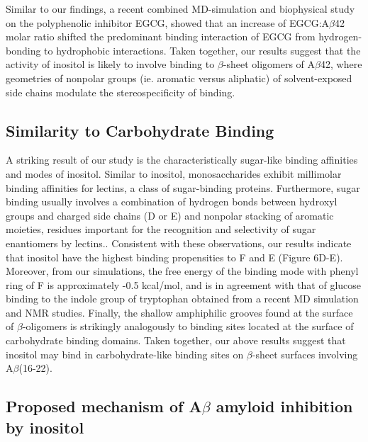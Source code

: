 Similar to our findings, a recent combined MD-simulation and biophysical study\cite{Wang:2010p204} on the polyphenolic inhibitor EGCG,\cite{Ehrnhoefer:2008p8,Wang:2010p204} showed that an increase of EGCG:A$\beta$42 molar ratio shifted the predominant binding interaction of EGCG from hydrogen-bonding to hydrophobic interactions.
Taken together, our results suggest that the activity of inositol is likely to involve binding to $\beta$-sheet oligomers of A$\beta$42, where geometries of nonpolar groups (ie. aromatic versus aliphatic) of solvent-exposed side chains modulate the stereospecificity of binding.


\subsection{Similarity to Carbohydrate Binding}

A striking result of our study is the characteristically sugar-like \cite{Taroni:2000p195} binding affinities and modes of inositol. Similar to inositol, monosaccharides exhibit millimolar binding affinities for lectins, a class of sugar-binding proteins.\cite{Wohlert:2010p201,Geisler:2010p188} Furthermore, sugar binding usually involves a combination of hydrogen bonds between hydroxyl groups and charged side chains (D or E) and nonpolar stacking of aromatic moieties, residues important for the recognition and selectivity of sugar enantiomers by lectins.\cite{Sharon:2001p215}. Consistent with these observations, our results indicate that inositol have the highest binding propensities to F and E (Figure 6D-E). Moreover, from our simulations, the free energy of the binding mode with phenyl ring of F is approximately -0.5 kcal/mol, and is in agreement with that of glucose binding to the indole group of tryptophan obtained from a recent MD simulation\cite{Wohlert:2010p201} and NMR studies\cite{Kiehna:2007p163}. Finally, the shallow amphiphilic grooves found at the surface of $\beta$-oligomers is strikingly analogously to binding sites located at the surface of carbohydrate binding domains.\cite{Taroni:2000p195,Kulharia:2009p212,Weis:1996p225}  Taken together, our above results suggest that inositol may bind in carbohydrate-like binding sites on $\beta$-sheet surfaces involving A$\beta$(16-22).


\subsection{Proposed mechanism of A$\beta$ amyloid inhibition by inositol}

